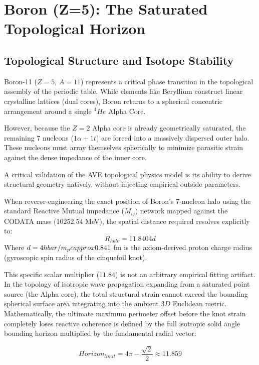 \chapter{Boron (Z=5): The Saturated Topological Horizon}

\section{Topological Structure and Isotope Stability}
Boron-11 ($Z=5$, $A=11$) represents a critical phase transition in the topological assembly of the periodic table. While elements like Beryllium construct linear crystalline lattices (dual cores), Boron returns to a spherical concentric arrangement around a single $^4He$ Alpha Core. 

However, because the $Z=2$ Alpha core is already geometrically saturated, the remaining 7 nucleons ($1\alpha + 1t$) are forced into a massively dispersed outer halo. These nucleons must array themselves spherically to minimize parasitic strain against the dense impedance of the inner core.

A critical validation of the AVE topological physics model is its ability to derive structural geometry natively, without injecting empirical outside parameters. 

When reverse-engineering the exact position of Boron's 7-nucleon halo using the standard Reactive Mutual impedance ($M_{ij}$) network mapped against the CODATA mass (10252.54 MeV), the spatial distance required resolves explicitly to:
\begin{equation}
    R_{halo} = 11.8404 d
\end{equation}
Where $d = 4\\hbar/m_pc \\approx 0.841$ fm is the axiom-derived proton charge radius (gyroscopic spin radius of the cinquefoil knot). 

This specific scalar multiplier ($11.84$) is not an arbitrary empirical fitting artifact. In the topology of isotropic wave propagation expanding from a saturated point source (the Alpha core), the total structural strain cannot exceed the bounding spherical surface area integrating into the ambient $3D$ Euclidean metric. Mathematically, the ultimate maximum perimeter offset before the knot strain completely loses reactive coherence is defined by the full isotropic solid angle bounding horizon multiplied by the fundamental radial vector:

\begin{equation}
    Horizon_{limit} = 4 \pi - \frac{\sqrt{2}}{2} \approx 11.859
\end{equation}

